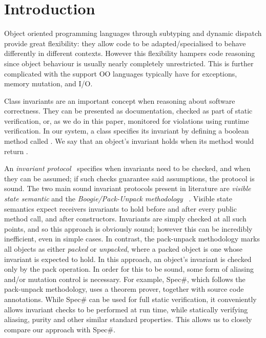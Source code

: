 \section{Introduction}
\label{s:intro}

Object oriented programming languages through subtyping and dynamic dispatch provide great flexibility: they
allow code to be adapted/specialised to behave differently in different contexts.
However this flexibility hampers code reasoning since object behaviour is usually nearly completely
unrestricted. This is further complicated with the support OO languages typically have for exceptions,
memory mutation, and I/O.


Class invariants are an important concept when reasoning about software correctness.
They can be presented as documentation, checked as part of static verification, or, as we do in this paper, monitored for violations using runtime verification.
In our system, a class specifies its invariant by defining a boolean method called \Q@invariant@.
We say that an object's invariant holds when its \Q@invariant@ method would return \Q@true@.

An \emph{invariant protocol}~\cite{FlexibleInvariants} specifies when invariants need to be checked, and when they can be assumed; if such checks guarantee said assumptions, the protocol is sound.
The two main sound invariant protocols present in literature are \emph{visible state semantic} \cite{Meyer:1988:OSC:534929} and the \emph{Boogie/Pack-Unpack methodology} ~\cite{DBLP:journals/jot/BarnettDFLS04}. Visible state semantics expect receivers invariants to hold before and after every public method call, and after constructors. Invariants are simply checked at all such points, and so this approach is obviously sound; however this can be incredibly inefficient, even in simple cases.
In contrast, the pack-unpack methodology marks all objects as either \emph{packed} or \emph{unpacked}, where a packed object is one whose invariant is expected to hold.
In this approach, an object's invariant is checked only by the pack operation.
In order for this to be sound, some form of aliasing and/or mutation control is necessary. For example, Spec\#, which follows the pack-unpack methodology, uses a theorem prover, together with source code annotations.
While Spec\# can be used for full static verification, it conveniently allows invariant checks to be performed
at run time, while statically verifying aliasing, purity and other similar standard properties.
This allows us to closely compare our approach with Spec\#.

